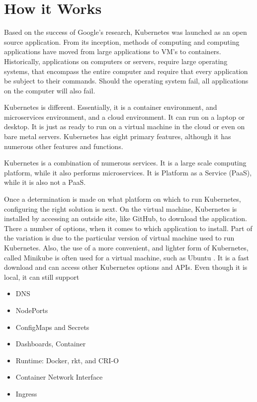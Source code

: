 \section{How it Works}

 
Based on the success of Google's research, Kubernetes was launched as
an open source application.  From its inception, methods of computing 
and computing applications have moved from large applications to VM's
to containers.  Historically, applications on computers or servers, require
large operating systems, that encompass the entire computer and
require that every application be subject to their commands.  Should
the operating system fail, all applications on the computer will also
fail.   

Kubernetes is different.  Essentially, it is a container environment,
and microservices environment, and a cloud environment.  It can run on
a laptop or desktop.  It is just as ready to run on a virtual machine
in the cloud or even on bare metal servers.  Kubernetes
has eight primary features, although it has numerous other features
and functions.

Kubernetes is a combination of numerous services.  It is a large scale
computing platform, while it also performs microservices.  It is
Platform as a Service (PaaS), while it is also not a PaaS. 

Once a determination is made on what platform on which to run
Kubernetes, configuring the right solution is next.  On the virtual 
machine, Kubernetes is installed by accessing an
outside site, like GitHub, to download the application.  There a
number of options, when it comes to which application to install.
Part of the variation is due to the particular version of virtual
machine used to run Kubernetes.  Also, the use of a more convenient,
and lighter form of Kubernetes, called Minikube is often used for a
virtual machine, such as
Ubuntu \cite{minikube}. 
It is a fast download and can access other Kubernetes options and
APIs.  Even though it is local, it can still
support~\cite{hid-sp18-525-concept}

\begin{itemize}
    \item DNS 
    
    \item NodePorts 
    
    \item ConfigMaps and Secrets 
    
    \item Dashboards, Container 
    
    \item Runtime:  Docker, rkt, and CRI-O 
    
    \item Container Network Interface
    
    \item Ingress  
 \end{itemize}   
 
